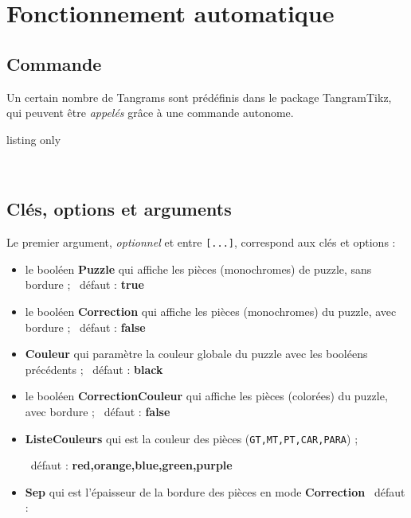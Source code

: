 \documentclass{article}
\newcommand\Cle[1]{{\bfseries\sffamily\textlangle #1\textrangle}}
\begin{document}
\pagebreak

\section{Fonctionnement \og automatique \fg}

\subsection{Commande}

Un certain nombre de Tangrams sont prédéfinis dans le package \textsf{TangramTikz}, qui peuvent être \textit{appelés} grâce à une commande autonome.

\begin{PresentationCode}{listing only}
\end{PresentationCode}

\begin{PresentationCode}{}
~~~~
\end{PresentationCode}

\subsection{Clés, options et arguments}

Le premier argument, \textit{optionnel} et entre \texttt{[...]}, correspond aux clés et options :

\begin{itemize}
	\item le booléen \Cle{Puzzle} qui affiche les pièces (monochromes) de puzzle, sans bordure ; \hfill~défaut : \Cle{true}
	\item le booléen \Cle{Correction} qui affiche les pièces (monochromes) du puzzle, avec bordure ; \hfill~défaut : \Cle{false}
	\item \Cle{Couleur} qui paramètre la couleur globale du puzzle avec les booléens précédents ; \hfill~défaut : \Cle{black}
	\item le booléen \Cle{CorrectionCouleur} qui affiche les pièces (colorées) du puzzle, avec bordure ; \hfill~défaut : \Cle{false}
	\item \Cle{ListeCouleurs} qui est la couleur des pièces (\texttt{GT,MT,PT,CAR,PARA})  ;
	
	\hfill~défaut : \Cle{red,orange,blue,green,purple}
	\item \Cle{Sep} qui est l'épaisseur de la bordure des pièces en mode \Cle{Correction} \hfill~défaut : \Cle{1pt}
\end{itemize}
\end{document}

